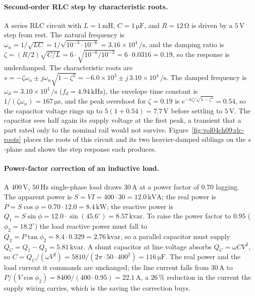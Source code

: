 \paragraph{Second-order RLC step by characteristic roots.}
A series RLC circuit with $L = 1\,\si{\milli\henry}$, $C = 1\,\si{\micro
\farad}$, and $R = 12\,\si{\ohm}$ is driven by a $5\,\si{\volt}$ step
from rest. The natural frequency is $\omega_{n} = 1/\sqrt{LC} =
1/\sqrt{10^{-3}\cdot 10^{-6}} = 3.16\times 10^{4}\,\si{\per\second}$, and
the damping ratio is $\zeta = (R/2)\sqrt{C/L} = 6\cdot\sqrt{10^{-6}/
10^{-3}} = 6\cdot 0.0316 = 0.19$, so the response is underdamped. The
characteristic roots are $s = -\zeta\omega_{n}\pm j\omega_{n}\sqrt{1-
\zeta^{2}} = -6.0\times 10^{3}\pm j\,3.10\times 10^{4}\,\si{\per
\second}$. The damped frequency is $\omega_{d} = 3.10\times 10^{4}\,\si{
\per\second}$ ($f_{d} = 4.94\,\si{\kilo\hertz}$), the envelope time
constant is $1/(\zeta\omega_{n}) = 167\,\si{\micro\second}$, and the
peak overshoot for $\zeta = 0.19$ is $e^{-\pi\zeta/\sqrt{1-\zeta^{2}}} =
0.54$, so the capacitor voltage rings up to $5(1+0.54) = 7.7\,\si{\volt}$
before settling to $5\,\si{\volt}$. The capacitor sees half again its
supply voltage at the first peak, a transient that a part rated only to
the nominal rail would not survive. Figure~\ref{fig:vol04ch09:rlc-roots}
places the roots of this circuit and its two heavier-damped siblings on
the $s$-plane and shows the step response each produces.



\paragraph{Power-factor correction of an inductive load.}
A $400\,\si{\volt}$, $50\,\si{\hertz}$ single-phase load draws
$30\,\si{\ampere}$ at a power factor of $0.70$ lagging. The apparent
power is $S = VI = 400\cdot 30 = 12.0\,\si{\kilo\volt\ampere}$; the real
power is $P = S\cos\phi = 0.70\cdot 12.0 = 8.4\,\si{\kilo\watt}$; the
reactive power is $Q_{1} = S\sin\phi = 12.0\cdot\sin(45.6^\circ) =
8.57\,\text{kvar}$. To raise the power factor to $0.95$ ($\phi_{2} =
18.2^\circ$) the load reactive power must fall to $Q_{2} = P\tan\phi_{2}
= 8.4\cdot 0.329 = 2.76\,\text{kvar}$, so a parallel capacitor must
supply $Q_{C} = Q_{1}-Q_{2} = 5.81\,\text{kvar}$. A shunt capacitor at
line voltage absorbs $Q_{C} = \omega C V^{2}$, so $C = Q_{C}/(\omega
V^{2}) = 5810/(2\pi\cdot 50\cdot 400^{2}) = 116\,\si{\micro\farad}$. The
real power and the load current it commands are unchanged; the line
current falls from $30\,\si{\ampere}$ to $P/(V\cos\phi_{2}) = 8400/
(400\cdot 0.95) = 22.1\,\si{\ampere}$, a $26\,\%$ reduction in the
current the supply wiring carries, which is the saving the correction
buys.

